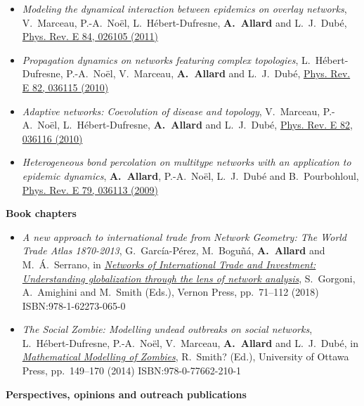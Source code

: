 \documentclass[11pt]{article}
\begin{document}
\begin{itemize}[itemsep=0.5em]
%
  \item \textit{Modeling the dynamical interaction between epidemics on overlay networks}, V.~Marceau, P.-A.~No\"el, L.~H\'ebert-Dufresne, \textbf{A.~Allard} and L.~J.~Dub\'e, \href{http://dx.doi.org/10.1103/PhysRevE.84.026105}{Phys. Rev. E 84, 026105 (2011)}
%
  \item \textit{Propagation dynamics on networks featuring complex topologies}, L.~H\'ebert-Dufresne, P.-A.~No\"el, V.~Marceau, \textbf{A.~Allard} and L.~J.~Dub\'e, \href{http://dx.doi.org/10.1103/PhysRevE.82.036115}{Phys. Rev. E 82, 036115 (2010)}
%
  \item \textit{Adaptive networks: Coevolution of disease and topology}, V.~Marceau, P.-A.~No\"el, L.~H\'ebert-Dufresne, \mbox{\textbf{A.~Allard}} and L.~J.~Dub\'e, \href{http://dx.doi.org/10.1103/PhysRevE.82.036116}{Phys. Rev. E 82, 036116 (2010)}
%
  \item \textit{Heterogeneous bond percolation on multitype networks with an application to epidemic dynamics}, \mbox{\textbf{A.~Allard}}, P.-A.~No\"el, L.~J.~Dub\'e and B.~Pourbohloul, \href{http://dx.doi.org/10.1103/PhysRevE.79.036113}{Phys. Rev. E 79, 036113 (2009)}
%
\end{itemize}
%
%
%
\textbf{Book chapters}
%
\begin{itemize}[itemsep=0.5em]
%
  \item \textit{A new approach to international trade from Network Geometry: The World Trade Atlas 1870-2013}, G.~Garc\'ia-P\'erez, M.~Bogu\~n\'a, \textbf{A.~Allard} and M.~\'A.~Serrano, in \href{https://vernonpress.com/book/96}{\textit{Networks of International Trade and Investment: Understanding globalization through the lens of network analysis}}, S.~Gorgoni, A.~Amighini and M.~Smith (Eds.), Vernon Press, pp.~71--112 (2018) ISBN:978-1-62273-065-0
%
  \item \textit{The Social Zombie: Modelling undead outbreaks on social networks}, L.~H\'ebert-Dufresne, P.-A.~No\"el, V.~Marceau, \textbf{A.~Allard} and L.~J.~Dub\'e, in \href{http://www.press.uottawa.ca/mathematical-modelling-of-zombies}{\textit{Mathematical Modelling of Zombies}}, R.~Smith$\!$? (Ed.), University of Ottawa Press, pp.~149--170 (2014) ISBN:978-0-77662-210-1
%
\end{itemize}
%
%
%
\textbf{Perspectives, opinions and outreach publications}
%
\end{document}
